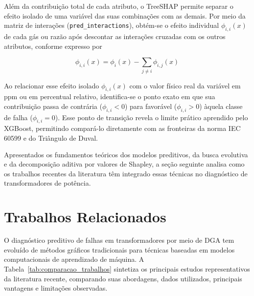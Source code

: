 Além da contribuição total de cada atributo, o TreeSHAP permite separar o efeito isolado de uma variável das suas combinações com as demais. Por meio da matriz de interações (\texttt{pred\_interactions}), obtém-se o efeito individual $\phi_{i,i}(x)$ de cada gás ou razão após descontar as interações cruzadas com os outros atributos, conforme expresso por

\begin{equation}\label{eq:main_effect}
\phi_{i,i}(x) = \phi_i(x) - \sum_{j \neq i} \phi_{i,j}(x)
\end{equation}

Ao relacionar esse efeito isolado $\phi_{i,i}(x)$ com o valor físico real da variável em ppm ou em percentual relativo, identifica-se o ponto exato em que sua contribuição passa de contrária ($\phi_{i,i} < 0$) para favorável ($\phi_{i,i} > 0$) àquela classe de falha ($\phi_{i,i} = 0$). Esse ponto de transição revela o limite prático aprendido pelo XGBoost, permitindo compará-lo diretamente com as fronteiras da norma IEC 60599 e do Triângulo de Duval.

Apresentados os fundamentos teóricos dos modelos preditivos, da busca evolutiva e da decomposição aditiva por valores de Shapley, a seção seguinte analisa como os trabalhos recentes da literatura têm integrado essas técnicas no diagnóstico de transformadores de potência.

\section{Trabalhos Relacionados}\label{sec:trabalhos_relacionados}

O diagnóstico preditivo de falhas em transformadores por meio de DGA tem evoluído de métodos gráficos tradicionais para técnicas baseadas em modelos computacionais de aprendizado de máquina. A Tabela~\ref{tab:comparacao_trabalhos} sintetiza os principais estudos representativos da literatura recente, comparando suas abordagens, dados utilizados, principais vantagens e limitações observadas.

